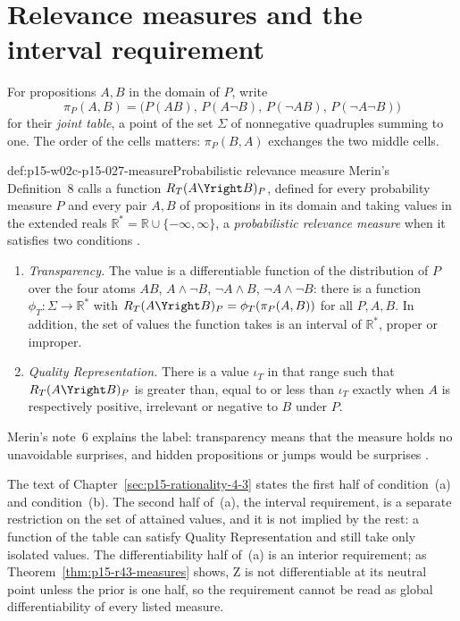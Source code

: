 \section{Relevance measures and the interval requirement}
\label{sec:p15-w02c-p15-027-measures}

For propositions \(A,B\) in the domain of \(P\), write
\[
 \pi_P(A,B)=\bigl(P(AB),\,P(A\neg B),\,P(\neg AB),\,P(\neg A\neg B)\bigr)
\]
for their \emph{joint table}, a point of the set \(\Sigma\) of
nonnegative quadruples summing to one. The order of the cells matters:
\(\pi_P(B,A)\) exchanges the two middle cells.

\begin{hbdefinition}{def:p15-w02c-p15-027-measure}{Probabilistic relevance measure}
Merin's Definition~8 calls a function \(R_T(A\Yright B)_P\), defined
for every probability measure \(P\) and every pair \(A,B\) of
propositions in its domain and taking values in the extended reals
\(\mathbb R^*=\mathbb R\cup\{-\infty,\infty\}\), a
\emph{probabilistic relevance measure} when it satisfies two conditions
\cite[p.~269]{Merin2021Relevance}.
\begin{enumerate}
\item[(a)] \emph{Transparency.} The value is a differentiable function
  of the distribution of \(P\) over the four atoms \(AB\),
  \(A\wedge\neg B\), \(\neg A\wedge B\), \(\neg A\wedge\neg B\):
  there is a function \(\phi_T:\Sigma\to\mathbb R^*\) with
  \(R_T(A\Yright B)_P=\phi_T(\pi_P(A,B))\) for all \(P,A,B\).
  In addition, the set of values the function takes is an interval of
  \(\mathbb R^*\), proper or improper.
\item[(b)] \emph{Quality Representation.} There is a value
  \(\iota_T\) in that range such that \(R_T(A\Yright B)_P\) is greater
  than, equal to or less than \(\iota_T\) exactly when \(A\) is
  respectively positive, irrelevant or negative to \(B\) under \(P\).
\end{enumerate}
Merin's note~6 explains the label: transparency means that the measure
holds no unavoidable surprises, and hidden propositions or jumps would
be surprises \cite[p.~274, n.~6]{Merin2021Relevance}.
\end{hbdefinition}

The text of Chapter~\ref{sec:p15-rationality-4-3} states the first half
of condition~(a) and condition~(b). The second half of~(a), the interval
requirement, is a separate restriction on the set of attained values,
and it is not implied by the rest: a function of the table can satisfy
Quality Representation and still take only isolated values. The
differentiability half of~(a) is an interior requirement; as
Theorem~\ref{thm:p15-r43-measures} shows, Z is not differentiable at
its neutral point unless the prior is one half, so the requirement
cannot be read as global differentiability of every listed measure.

